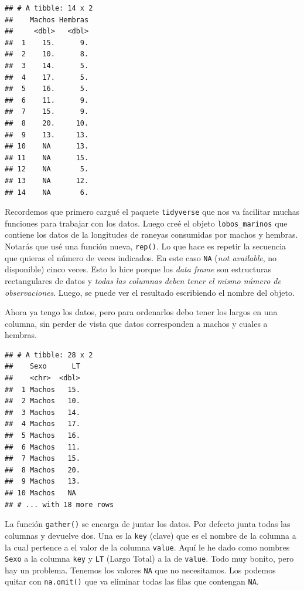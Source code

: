 \documentclass[]{book}
\newenvironment{Shaded}{\begin{snugshade}}{\end{snugshade}}
\newcommand{\DataTypeTok}[1]{\textcolor[rgb]{0.13,0.29,0.53}{#1}}
\newcommand{\KeywordTok}[1]{\textcolor[rgb]{0.13,0.29,0.53}{\textbf{#1}}}
\newcommand{\NormalTok}[1]{#1}
\newcommand{\OperatorTok}[1]{\textcolor[rgb]{0.81,0.36,0.00}{\textbf{#1}}}
\newcommand{\StringTok}[1]{\textcolor[rgb]{0.31,0.60,0.02}{#1}}
\theoremstyle{definition}
\theoremstyle{definition}
\theoremstyle{definition}
\theoremstyle{remark}
\begin{document}
\begin{verbatim}
## # A tibble: 14 x 2
##    Machos Hembras
##     <dbl>   <dbl>
##  1    15.      9.
##  2    10.      8.
##  3    14.      5.
##  4    17.      5.
##  5    16.      5.
##  6    11.      9.
##  7    15.      9.
##  8    20.     10.
##  9    13.     13.
## 10    NA      13.
## 11    NA      15.
## 12    NA       5.
## 13    NA      12.
## 14    NA       6.
\end{verbatim}

Recordemos que primero cargué el paquete \texttt{tidyverse} que nos va
facilitar muchas funciones para trabajar con los datos. Luego creé el
objeto \texttt{lobos\_marinos} que contiene los datos de la longitudes
de raneyas consumidas por machos y hembras. Notarás que usé una función
nueva, \texttt{rep()}. Lo que hace es repetir la secuencia que quieras
el número de veces indicados. En este caso \texttt{NA} (\emph{not
available}, no disponible) cinco veces. Esto lo hice porque los
\emph{data frame} son estructuras rectangulares de datos y \emph{todas
las columnas deben tener el mismo número de observaciones}. Luego, se
puede ver el resultado escribiendo el nombre del objeto.

Ahora ya tengo los datos, pero para ordenarlos debo tener los largos en
una columna, sin perder de vista que datos corresponden a machos y
cuales a hembras.

\begin{Shaded}
\end{Shaded}

\begin{verbatim}
## # A tibble: 28 x 2
##    Sexo      LT
##    <chr>  <dbl>
##  1 Machos   15.
##  2 Machos   10.
##  3 Machos   14.
##  4 Machos   17.
##  5 Machos   16.
##  6 Machos   11.
##  7 Machos   15.
##  8 Machos   20.
##  9 Machos   13.
## 10 Machos   NA 
## # ... with 18 more rows
\end{verbatim}

La función \texttt{gather()} se encarga de juntar los datos. Por defecto
junta todas las columnas y devuelve dos. Una es la \texttt{key} (clave)
que es el nombre de la columna a la cual pertence a el valor de la
columna \texttt{value}. Aquí le he dado como nombres \texttt{Sexo} a la
columna \texttt{key} y \texttt{LT} (Largo Total) a la de \texttt{value}.
Todo muy bonito, pero hay un problema. Tenemos los valores \texttt{NA}
que no necesitamos. Los podemos quitar con \texttt{na.omit()} que va
eliminar todas las filas que contengan \texttt{NA}.
\end{document}
